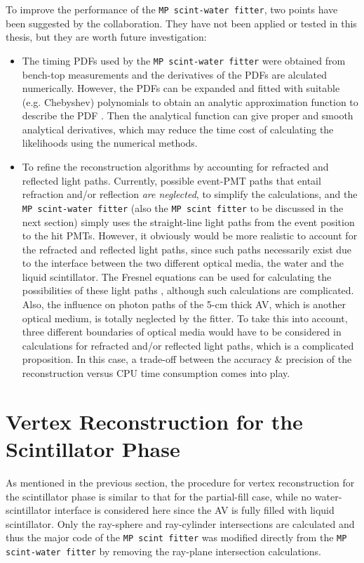 To improve the performance of the \texttt{MP scint-water fitter}, two points have been suggested by the collaboration. They have not been applied or tested in this thesis, but they are worth future investigation:
\begin{itemize}
	\item The timing PDFs used by the \texttt{MP scint-water fitter} were obtained from bench-top measurements and the derivatives of the PDFs are alculated numerically. However, the PDFs can be expanded and fitted with suitable (e.g. Chebyshev) polynomials to obtain an analytic approximation function to describe the PDF \cite{press2007numerical}. Then the analytical function can give proper and smooth analytical derivatives, which may reduce the time cost of calculating the likelihoods using the numerical methods.	
	
	\item To refine the reconstruction algorithms by accounting for refracted and reflected light paths. Currently, possible event-PMT paths that entail refraction and/or reflection {\em are neglected}, to simplify the calculations, and the \texttt{MP scint-water fitter} (also the \texttt{MP scint fitter} to be discussed in the next section) simply uses the straight-line light paths from the event position to the hit PMTs. However, it obviously would be more realistic to account for the refracted and reflected light paths, since such paths necessarily exist due to the interface between the two different optical media, the water and the liquid scintillator. The Fresnel equations can be used for calculating the possibilities of these light paths \cite{partialWater}, although such calculations are complicated. Also, the influence on photon paths of the 5-cm thick AV, which is another optical medium, is totally neglected by the fitter. To take this into account, three different boundaries of optical media would have to be considered in calculations for refracted and/or reflected light paths, which is a complicated proposition. In this case, a trade-off between the accuracy \& precision of the reconstruction versus CPU time consumption comes into play.
\end{itemize}

\section{Vertex Reconstruction for the Scintillator Phase}\label{sect:scintFitter}

As mentioned in the previous section, the procedure for vertex reconstruction for the scintillator phase is similar to that for the partial-fill case, while no water-scintillator interface is considered here since the AV is fully filled with liquid scintillator. Only the ray-sphere and ray-cylinder intersections are calculated and thus the major code of the \texttt{MP scint fitter} was modified directly from the \texttt{MP scint-water fitter} by removing the ray-plane intersection calculations.

